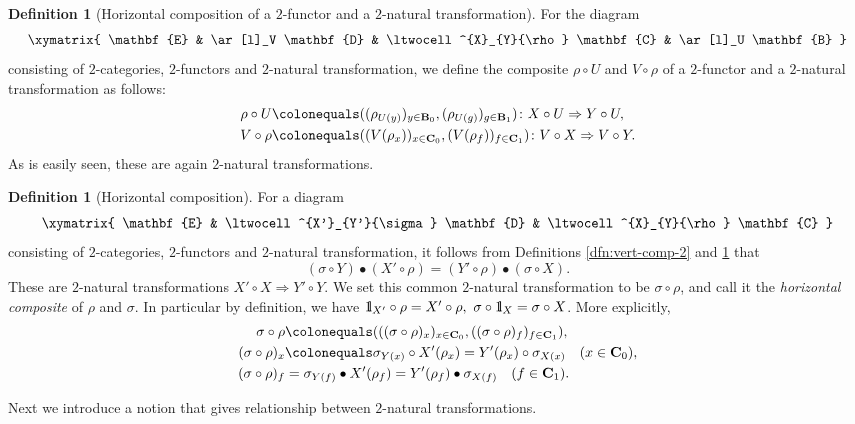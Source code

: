 \documentclass{surv-l}
\numberwithin{equation}{chapter}
\numberwithin{figure}{chapter}
\theoremstyle{plain}
\theoremstyle{definition}
\newtheorem{dfn}[thm]{Definition}
\theoremstyle{remark}
\newcommand{\id}{1\kern-.25em{\text{{\rm l}}}}
\begin{document}
\begin{dfn}[Horizontal composition of a $2$-functor and
a $2$-natural transformation]\label{dfn:horizon-comp-2}
For the diagram
\[
\xymatrix{
\mathbf{E} & \ar[l]_V \mathbf{D} & \ltwocell^{X}_{Y}{\rho} \mathbf{C} & \ar[l]_U \mathbf{B}
}
\]
consisting of $2$-categories, $2$-functors and $2$-natural transformation,
we define the composite $\rho \circ U$ and $V \circ \rho$
of a $2$-functor and a $2$-natural transformation
as follows:
\[
\begin{aligned}
\rho \circ U&\colonequals  ((\rho_{U(y)})_{y \in \mathbf{B}_0}, (\rho_{U(g)})_{g \in \mathbf{B}_1}) \colon X \circ U \Rightarrow Y \circ U,\\
V \circ \rho&\colonequals  ((V(\rho_x))_{x \in \mathbf{C}_0}, (V(\rho_f))_{f \in \mathbf{C}_1}) \colon V \circ X \Rightarrow V \circ Y.
\end{aligned}
\]
As is easily seen, these are again $2$-natural transformations.
\end{dfn}

\begin{dfn}[Horizontal composition]
For a diagram
\[
\xymatrix{
\mathbf{E} & \ltwocell^{X'}_{Y'}{\sigma} \mathbf{D} & \ltwocell^{X}_{Y}{\rho} \mathbf{C}
}
\]
consisting of $2$-categories, $2$-functors and $2$-natural transformation,
it follows from Definitions  \ref{dfn:vert-comp-2} and \ref{dfn:horizon-comp-2}
that
\[
(\sigma \circ Y) \bullet (X' \circ \rho) = (Y' \circ \rho) \bullet (\sigma \circ X).
\]
These are $2$-natural transformations $X' \circ X \Rightarrow Y' \circ Y$.
We set this common $2$-natural transformation
to be  $\sigma \circ \rho$, and call it the \emph{horizontal composite} of $\rho$ and $\sigma$.
In particular by definition,
we have $\id_{X'} \circ \rho = X'\circ \rho,\  \sigma \circ \id_X = \sigma \circ X$.
More explicitly,
\[
\begin{aligned}
\sigma \circ \rho&\colonequals  (((\sigma \circ \rho)_x)_{x \in \mathbf{C}_0}, ((\sigma \circ \rho)_f)_{f \in \mathbf{C}_1}),\\
(\sigma \circ \rho)_x&\colonequals  \sigma_{Y(x)} \circ X'(\rho_x) = Y'(\rho_x) \circ \sigma_{X(x)} \quad (x \in \mathbf{C}_0),\\
(\sigma \circ \rho)_f&= \sigma_{Y(f)} \bullet X'(\rho_f) =Y'(\rho_f) \bullet \sigma_{X(f)} \quad (f \in \mathbf{C}_1).
\end{aligned}
\]
\end{dfn}

Next we introduce a notion that gives relationship between
$2$-natural transformations.
\end{document}
